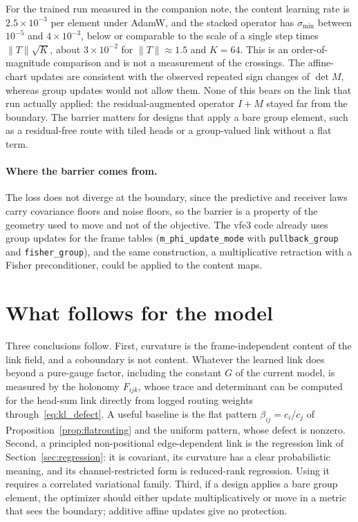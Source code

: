 \documentclass[11pt]{article}
\theoremstyle{definition}
\theoremstyle{remark}
\newcommand{\cfg}[1]{\texttt{#1}}
\begin{document}
For the trained run measured in the companion note, the content learning rate is $2.5\times10^{-3}$ per element under AdamW, and the stacked operator has $\sigma_{\min}$ between $10^{-5}$ and $4\times10^{-3}$, below or comparable to the scale of a single step times $\|T\|\sqrt K$, about $3\times10^{-2}$ for $\|T\|\approx1.5$ and $K=64$. This is an order-of-magnitude comparison and is not a measurement of the crossings. The affine-chart updates are consistent with the observed repeated sign changes of $\det M$, whereas group updates would not allow them. None of this bears on the link that run actually applied: the residual-augmented operator $I+M$ stayed far from the boundary. The barrier matters for designs that apply a bare group element, such as a residual-free route with tiled heads or a group-valued link without a flat term.

\paragraph{Where the barrier comes from.}
The loss does not diverge at the boundary, since the predictive and receiver laws carry covariance floors and noise floors, so the barrier is a property of the geometry used to move and not of the objective. The vfe3 code already uses group updates for the frame tables (\cfg{m\_phi\_update\_mode} with \cfg{pullback\_group} and \cfg{fisher\_group}), and the same construction, a multiplicative retraction with a Fisher preconditioner, could be applied to the content maps.

\section{What follows for the model}
\label{sec:model}

Three conclusions follow. First, curvature is the frame-independent content of the link field, and a coboundary is not content. Whatever the learned link does beyond a pure-gauge factor, including the constant $G$ of the current model, is measured by the holonomy $F_{ijk}$, whose trace and determinant can be computed for the head-sum link directly from logged routing weights through~\eqref{eq:kl_defect}. A useful baseline is the flat pattern $\beta_{ij}=c_i/c_j$ of Proposition~\ref{prop:flatrouting} and the uniform pattern, whose defect is nonzero. Second, a principled non-positional edge-dependent link is the regression link of Section~\ref{sec:regression}: it is covariant, its curvature has a clear probabilistic meaning, and its channel-restricted form is reduced-rank regression. Using it requires a correlated variational family. Third, if a design applies a bare group element, the optimizer should either update multiplicatively or move in a metric that sees the boundary; additive affine updates give no protection.
\end{document}
